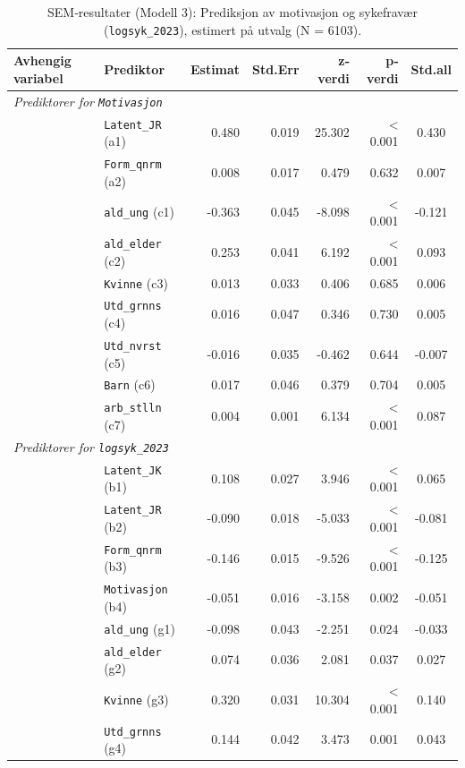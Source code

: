 \documentclass[
  12pt,
  a4paper,
  DIV=11,
  numbers=noendperiod]{scrartcl}
\begin{document}
\begin{table}[htbp]
\centering
\caption{SEM‐resultater (Modell 3): Prediksjon av motivasjon og sykefravær (\texttt{logsyk\_2023}), estimert på utvalg (N = 6103).}
\label{tab:sem_results_model3}
\begin{tabular}{@{}llrrrrc@{}}
\toprule
Avhengig variabel & Prediktor & Estimat & Std.Err & z‐verdi & p‐verdi & Std.all \\
\midrule
\multicolumn{7}{l}{\textit{Prediktorer for \texttt{Motivasjon}}} \\
& \texttt{Latent\_JR} (a1)        & 0.480 & 0.019 & 25.302 & < 0.001 & 0.430 \\
& \texttt{Form\_qnrm} (a2)        & 0.008 & 0.017 & 0.479  & 0.632   & 0.007 \\
& \texttt{ald\_ung} (c1)          & -0.363& 0.045 & -8.098 & < 0.001 & -0.121 \\
& \texttt{ald\_elder} (c2)        & 0.253 & 0.041 & 6.192  & < 0.001 & 0.093 \\
& \texttt{Kvinne} (c3)            & 0.013 & 0.033 & 0.406  & 0.685   & 0.006 \\
& \texttt{Utd\_grnns} (c4)        & 0.016 & 0.047 & 0.346  & 0.730   & 0.005 \\
& \texttt{Utd\_nvrst} (c5)        & -0.016& 0.035 & -0.462 & 0.644   & -0.007 \\
& \texttt{Barn} (c6)              & 0.017 & 0.046 & 0.379  & 0.704   & 0.005 \\
& \texttt{arb\_stlln} (c7)        & 0.004 & 0.001 & 6.134  & < 0.001 & 0.087 \\
\midrule
\multicolumn{7}{l}{\textit{Prediktorer for \texttt{logsyk\_2023}}} \\
& \texttt{Latent\_JK} (b1)        & 0.108 & 0.027 & 3.946  & < 0.001 & 0.065 \\
& \texttt{Latent\_JR} (b2)        & -0.090& 0.018 & -5.033 & < 0.001 & -0.081 \\
& \texttt{Form\_qnrm} (b3)        & -0.146& 0.015 & -9.526 & < 0.001 & -0.125 \\
& \texttt{Motivasjon} (b4)        & -0.051& 0.016 & -3.158 & 0.002   & -0.051 \\
& \texttt{ald\_ung} (g1)          & -0.098& 0.043 & -2.251 & 0.024   & -0.033 \\
& \texttt{ald\_elder} (g2)        & 0.074 & 0.036 & 2.081  & 0.037   & 0.027 \\
& \texttt{Kvinne} (g3)            & 0.320 & 0.031 & 10.304 & < 0.001 & 0.140 \\
& \texttt{Utd\_grnns} (g4)        & 0.144 & 0.042 & 3.473  & 0.001   & 0.043 \\

\end{tabular}
\end{table}
\end{document}
